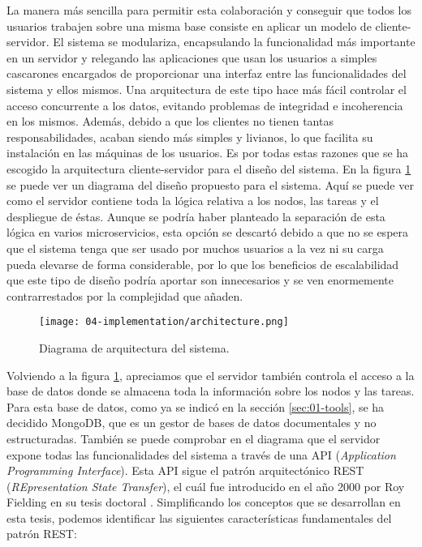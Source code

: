 La manera más sencilla para permitir esta colaboración y conseguir que todos los
usuarios trabajen sobre una misma base consiste en aplicar un modelo de
cliente-servidor. El sistema se modulariza, encapsulando la funcionalidad más
importante en un servidor y relegando las aplicaciones que usan los usuarios a
simples cascarones encargados de proporcionar una interfaz entre las
funcionalidades del sistema y ellos mismos. Una arquitectura de este tipo hace
más fácil controlar el acceso concurrente a los datos, evitando problemas de
integridad e incoherencia en los mismos. Además, debido a que los clientes no
tienen tantas responsabilidades, acaban siendo más simples y livianos, lo que
facilita su instalación en las máquinas de los usuarios. Es por todas estas
razones que se ha escogido la arquitectura cliente-servidor para el diseño del
sistema. En la figura \ref{fig:04-architecture} se puede ver un diagrama del
diseño propuesto para el sistema. Aquí se puede ver como el servidor contiene
toda la lógica relativa a los nodos, las tareas y el despliegue de éstas. Aunque
se podría haber planteado la separación de esta lógica en varios microservicios,
esta opción se descartó debido a que no se espera que el sistema tenga que ser
usado por muchos usuarios a la vez ni su carga pueda elevarse de forma
considerable, por lo que los beneficios de escalabilidad que este tipo de diseño
podría aportar son innecesarios y se ven enormemente contrarrestados por la
complejidad que añaden.

\begin{figure}
    \centering
    \texttt{[image: 04-implementation/architecture.png]}
    \caption{Diagrama de arquitectura del sistema.}
    \label{fig:04-architecture}
\end{figure}

Volviendo a la figura \ref{fig:04-architecture}, apreciamos que el servidor
también controla el acceso a la base de datos donde se almacena toda la
información sobre los nodos y las tareas. Para esta base de datos, como ya se
indicó en la sección \ref{sec:01-tools}, se ha decidido MongoDB, que es un gestor
de bases de datos documentales y no estructuradas. También se puede comprobar en
el diagrama que el servidor expone todas las funcionalidades del sistema a
través de una API (\textit{Application Programming Interface}). Esta API sigue
el patrón arquitectónico REST (\textit{REpresentation State Transfer}), el cuál
fue introducido en el año 2000 por Roy Fielding en su tesis doctoral
\cite{fielding_architectural_2000}. Simplificando los conceptos que se
desarrollan en esta tesis, podemos identificar las siguientes características
fundamentales del patrón REST:

